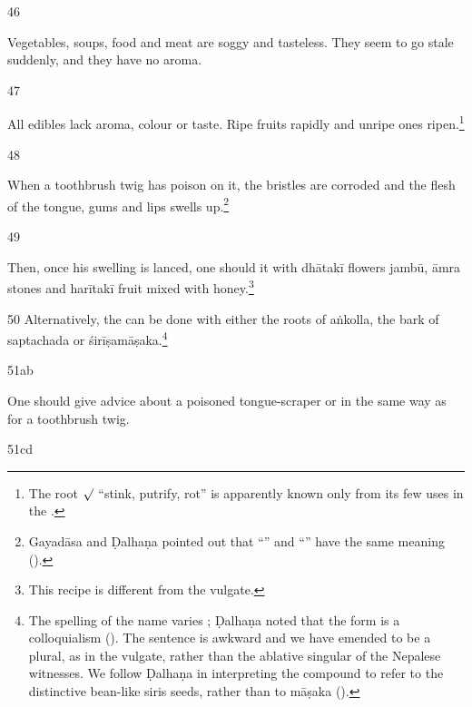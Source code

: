 \begin{translation}
\item[46]

Vegetables, soups, food and meat are soggy and tasteless.  They seem to go stale
suddenly, and they have no aroma.  

\item[47] 

All edibles lack aroma, colour or taste.  Ripe fruits rapidly  and 
unripe ones ripen.\footnote{The root $\surd$ “stink, 
    putrify, rot” 
    is apparently known only from its few uses in the \SS.}

\item[48]

When a toothbrush twig has poison on it, the bristles are corroded and the
flesh of the tongue, gums and lips swells up.\footnote{Gayadāsa and Ḍalhaṇa 
pointed out that “” and 
“” have the same meaning 
().}

\item[49]

 Then, once his swelling is 
 lanced, one should  it with
 \gls{dhātakī} flowers
 \gls{jambū},
 \gls{āmra} stones and
 \gls{harītakī}
 fruit mixed with honey.\footnote{This recipe is different from the vulgate.}
 
 \item[50] Alternatively, the  can be done with either
 the roots of \gls{aṅkolla}, the bark
of \gls{saptachada} or \gls{śirīṣamāṣaka}.\footnote{The 
    spelling of
the name  varies  
\citep[5]{gvdb};
Ḍalhaṇa noted that the form   is a colloquialism
().  The sentence is awkward and we have emended
 to be a plural, as in the vulgate, rather than the ablative 
singular of 
the Nepalese witnesses.  We follow Ḍalhaṇa in interpreting the compound to refer 
to the distinctive bean-like siris seeds, rather than to \gls{māṣaka} 
().}

\item[51ab] 
 
One should give advice about a poisoned tongue-scraper or 
 in the
same way as  for a toothbrush twig.

\item[51cd]


\end{translation}

